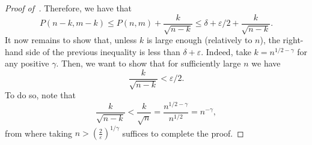 \begin{proof}[Proof of~]
 Therefore, we have that 
 \[ 
 P(n-k, m - k) \leq P(n, m) + \frac{k}{\sqrt{n-k}} \leq \delta + \varepsilon/2 + \frac{k}{\sqrt{n-k}}.
 \]
 It now remains to show that, unless $k$ is large enough (relatively to $n$), the right-hand side of the previous inequality is less than $\delta + \varepsilon$.
 Indeed, take $k = n^{1/2 - \gamma}$ for any positive $\gamma$. Then, we want to show that for sufficiently large $n$ we have
 \[ 
 \frac{k}{\sqrt{n-k}} < \varepsilon/2.
 \]
To do so, note that
\[
\frac{k}{\sqrt{n-k}} < \frac{k}{\sqrt{n}}
                     = \frac{n^{1/2 - \gamma}}{n^{1/2}}
                     = n^{-\gamma},
\]
from where taking $n > \left(\frac{2}{\varepsilon}\right)^{1/\gamma}$ suffices to complete the proof.
\end{proof}

\subsection{\texorpdfstring{}{Proposition 2}}
